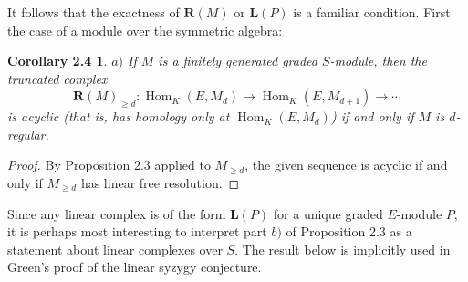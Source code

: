 \documentclass{tran-l}
\newcommand{\myHom}{\operatorname{Hom}}
\newcommand{\LL}{\mathbf{L}}
\newcommand{\RR}{\mathbf{R}}
\theoremstyle{plain}
\newtheorem*{theorem6}{Corollary 2.4}
\theoremstyle{remark}
\theoremstyle{definition}
\begin{document}
It follows that the exactness of $\RR (M)$ or $\LL (P)$ is a familiar
condition. First the case of a module over the symmetric algebra:
\begin{theorem6}
$a)$ If $M$ is a finitely generated graded $S$-module,
then
the truncated complex
\begin{equation*}\RR (M)_{\geq d}: \myHom _{K}(E,M_{d})\to \myHom
_{K}(E,M_{d+1})\to \cdots \end{equation*}
is acyclic (that is, has homology only at $\myHom _{K}(E,M_{d})$) if
and only if $M$ is $d$-regular.
\end{theorem6}
\begin{proof}  By Proposition 2.3 applied to $M_{\geq d}$, the
given sequence is acyclic if and only if $M_{\geq d}$ has
linear free resolution.\end{proof}


Since any linear complex is of the form $\LL (P)$ for
a unique graded $E$-module $P$, it is
perhaps most interesting to interpret part $b)$ of
Proposition 2.3 as a statement about linear complexes
over $S$. The result below is implicitly used in Green's \cite{Gre} proof
of the linear syzygy conjecture.
\end{document}
